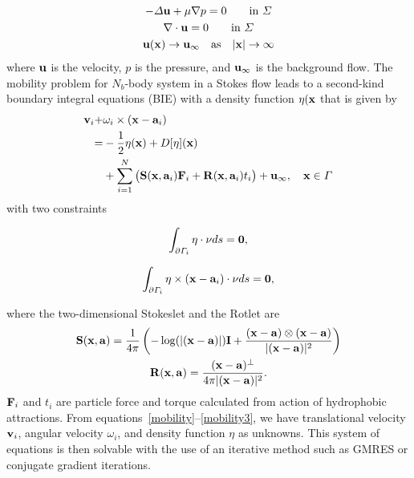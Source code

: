 \documentclass[lineno]{jfm}
\begin{document}
\begin{gather}
	-\Delta {\bf u} + \mu\nabla p = 0 \qquad \text{in }\Sigma\\
	\nabla\cdot {\bf u}=0 \qquad \text{in }\Sigma\\
	{\bf u}({\bf x}) \to {\bf u}_\infty \quad \text{as}\quad |{\bf x}|\to \infty
\end{gather}
%
where ${\bf u}$ is the velocity, $p$ is the pressure, and ${\bf u}_\infty$ is the background flow. 
%
%
The mobility problem for $N_b$-body system in a Stokes flow leads to a second-kind boundary integral equations (BIE) with a density function $\eta({\bf x}$ that is given by \cite{Lukas19}
\begin{equation}
\label{mobility}
\begin{aligned}
{\bf v}_i + &\omega_i\times({\bf x}-{\bf a}_i)\\
 =& -\frac12\eta({\bf x}) + D[\eta]({\bf x}) \\
&+ \sum_{i=1}^N\big({\bf S}({\bf x}, {\bf a}_i){\bf F}_i+ {\bf R}({\bf x}, {\bf a}_i)t_i\big)+{\bf u}_\infty, \quad {\bf x}\in\Gamma \\
\end{aligned}
\end{equation}
%
with two constraints 
%
\begin{center}
\begin{equation}
\label{mobility2}
\int_{\partial \Gamma_i}\eta\cdot \nu ds = {\bf 0},
\end{equation}
\end{center}
%
\begin{center}
\begin{equation}
\label{mobility3}
\int_{\partial \Gamma_i}\eta\times({\bf x}-{\bf a}_i)\cdot \nu ds ={\bf 0},
\end{equation}
\end{center}
%
where the two-dimensional Stokeslet and the Rotlet are
%
\begin{gather}
{\bf S}({\bf x}, {\bf a}) = \frac{1}{4\pi}\left(-\log(|({\bf x}-{\bf a})|){\bf I}+\frac{({\bf x}-{\bf a})\otimes({\bf x}-{\bf a})}{|({\bf x}-{\bf a})|^2}\right) \\ 
{\bf R}({\bf x},{\bf a})=\frac{({\bf x}-{\bf a})^\perp}{4\pi|({\bf x}-{\bf a})|^2}.
\end{gather}
%
${\bf F}_i$ and $t_i$ are particle force and torque calculated from action of hydrophobic attractions. From equations~\eqref{mobility}--\eqref{mobility3}, we have translational velocity ${\bf v}_i$, angular velocity $\omega_i$, and density function $\eta$ as unknowns.
This system of equations is then solvable with the use of an iterative method such as GMRES or conjugate gradient iterations.
\end{document}
